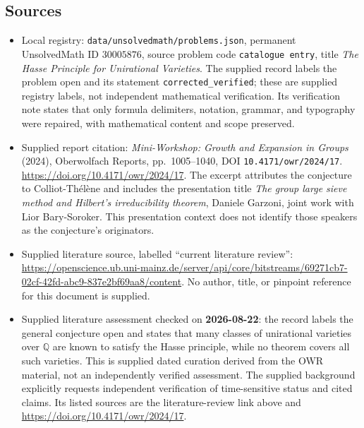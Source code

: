 \documentclass[11pt]{article}
\newcommand{\Q}{\mathbb{Q}}
\begin{document}
\subsection{Sources}
\begin{itemize}
\item Local registry: \texttt{data/unsolvedmath/problems.json}, permanent UnsolvedMath ID \(30005876\), source problem code \texttt{catalogue entry}, title \emph{The Hasse Principle for Unirational Varieties}. The supplied record labels the problem open and its statement \texttt{corrected\_verified}; these are supplied registry labels, not independent mathematical verification. Its verification note states that only formula delimiters, notation, grammar, and typography were repaired, with mathematical content and scope preserved.
\item Supplied report citation: \emph{Mini-Workshop: Growth and Expansion in Groups} (2024), Oberwolfach Reports, pp.\ 1005--1040, DOI \texttt{10.4171/owr/2024/17}. \url{https://doi.org/10.4171/owr/2024/17}. The excerpt attributes the conjecture to Colliot-Th\'el\`ene and includes the presentation title \emph{The group large sieve method and Hilbert's irreducibility theorem}, Daniele Garzoni, joint work with Lior Bary-Soroker. This presentation context does not identify those speakers as the conjecture's originators.
\item Supplied literature source, labelled ``current literature review'': \url{https://openscience.ub.uni-mainz.de/server/api/core/bitstreams/69271cb7-02cf-42fd-abc9-837e2bf69aa8/content}. No author, title, or pinpoint reference for this document is supplied.
\item Supplied literature assessment checked on \textbf{2026-08-22}: the record labels the general conjecture open and states that many classes of unirational varieties over \(\Q\) are known to satisfy the Hasse principle, while no theorem covers all such varieties. This is supplied dated curation derived from the OWR material, not an independently verified assessment. The supplied background explicitly requests independent verification of time-sensitive status and cited claims. Its listed sources are the literature-review link above and \url{https://doi.org/10.4171/owr/2024/17}.
\end{itemize}
\end{document}
